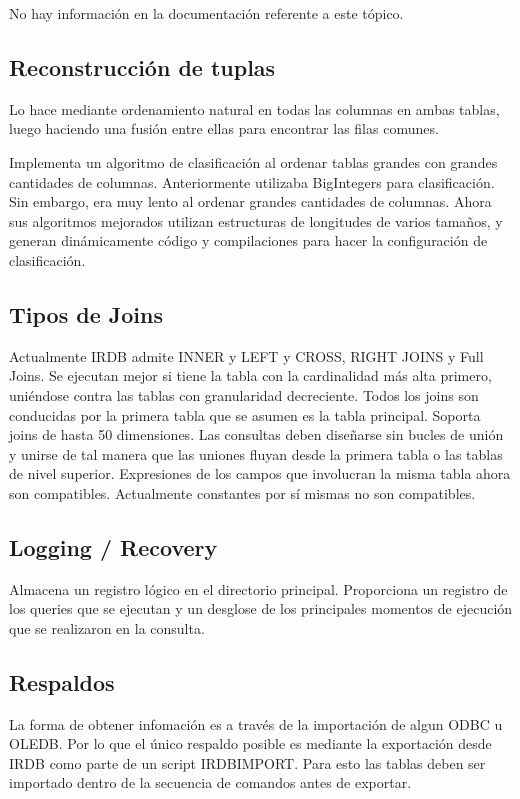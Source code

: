 \documentclass{acmart}
\begin{document}
No hay información en la documentación referente a este tópico.

\subsection{Reconstrucción de tuplas}

Lo hace mediante ordenamiento natural en todas las columnas en ambas tablas, luego haciendo una fusión entre ellas para encontrar las filas comunes.

Implementa un algoritmo de clasificación al ordenar tablas grandes con grandes cantidades de columnas. Anteriormente utilizaba BigIntegers para clasificación. Sin embargo, era muy lento al ordenar grandes cantidades de columnas. Ahora sus algoritmos mejorados utilizan estructuras de longitudes de varios tamaños, y generan dinámicamente código y compilaciones para hacer la configuración de clasificación.

\subsection{Tipos de Joins}

Actualmente IRDB admite INNER y LEFT y CROSS, RIGHT JOINS y Full Joins. Se ejecutan mejor si tiene la tabla con la cardinalidad más alta primero, uniéndose contra las tablas con granularidad decreciente. Todos los joins son conducidas por la primera tabla que se asumen es la tabla principal. Soporta joins de hasta 50 dimensiones. Las consultas deben diseñarse sin bucles de unión y unirse de tal manera que las uniones fluyan desde la primera tabla o las tablas de nivel superior. Expresiones de los campos que involucran la misma tabla ahora son compatibles. Actualmente constantes por sí mismas no son compatibles.

\subsection{Logging / Recovery}

Almacena un registro lógico en el directorio principal. Proporciona un registro de los queries que se ejecutan y un desglose de los principales momentos de ejecución que se realizaron en la consulta.

\subsection{Respaldos}

La forma de obtener infomación es a través de la importación de algun ODBC u OLEDB. Por lo que el único respaldo posible es mediante la exportación desde IRDB como parte de un script IRDBIMPORT. Para esto las tablas deben ser importado dentro de la secuencia de comandos antes de exportar.
\end{document}
